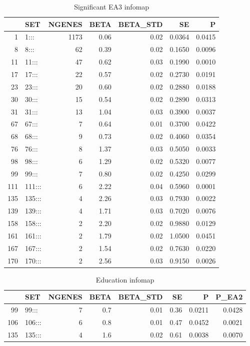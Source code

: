 \begin{table}[ht]
\centering
\begin{tabular}{rlrrrrr}
  \hline
 & SET & NGENES & BETA & BETA\_STD & SE & P \\ 
  \hline
1 & 1::: & 1173 & 0.06 & 0.02 & 0.0364 & 0.0415 \\ 
  8 & 8::: & 62 & 0.39 & 0.02 & 0.1650 & 0.0096 \\ 
  11 & 11::: & 47 & 0.62 & 0.03 & 0.1990 & 0.0010 \\ 
  17 & 17::: & 22 & 0.57 & 0.02 & 0.2730 & 0.0191 \\ 
  23 & 23::: & 20 & 0.60 & 0.02 & 0.2880 & 0.0188 \\ 
  30 & 30::: & 15 & 0.54 & 0.02 & 0.2890 & 0.0313 \\ 
  31 & 31::: & 13 & 1.04 & 0.03 & 0.3900 & 0.0037 \\ 
  67 & 67::: &  7 & 0.64 & 0.01 & 0.3700 & 0.0422 \\ 
  68 & 68::: &  9 & 0.73 & 0.02 & 0.4060 & 0.0354 \\ 
  76 & 76::: &  8 & 1.37 & 0.03 & 0.5050 & 0.0033 \\ 
  98 & 98::: &  6 & 1.29 & 0.02 & 0.5320 & 0.0077 \\ 
  99 & 99::: &  7 & 0.80 & 0.02 & 0.4250 & 0.0299 \\ 
  111 & 111::: &  6 & 2.22 & 0.04 & 0.5960 & 0.0001 \\ 
  135 & 135::: &  4 & 2.26 & 0.03 & 0.7930 & 0.0022 \\ 
  139 & 139::: &  4 & 1.71 & 0.03 & 0.7020 & 0.0076 \\ 
  158 & 158::: &  2 & 2.20 & 0.02 & 0.9880 & 0.0129 \\ 
  161 & 161::: &  2 & 1.79 & 0.02 & 1.0500 & 0.0451 \\ 
  167 & 167::: &  2 & 1.54 & 0.02 & 0.7630 & 0.0220 \\ 
  170 & 170::: &  2 & 2.56 & 0.03 & 0.9150 & 0.0026 \\ 
   \hline
\end{tabular}
\caption{Significant EA3 infomap}
\label{tab:infomap EA3}
\end{table}

\begin{table}[ht]
\centering
\begin{tabular}{rlrrrrrr}
  \hline
 & SET & NGENES & BETA & BETA\_STD & SE & P & P\_EA2 \\ 
  \hline
99 & 99::: &  7 & 0.7 & 0.01 & 0.36 & 0.0211 & 0.0428 \\ 
  106 & 106::: &  6 & 0.8 & 0.01 & 0.47 & 0.0452 & 0.0021 \\ 
  135 & 135::: &  4 & 1.6 & 0.02 & 0.61 & 0.0038 & 0.0070 \\ 
   \hline
\end{tabular}
\caption{Education infomap}
\label{tab:infomap education}
\end{table}

